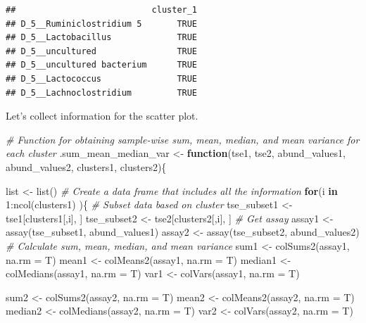 \documentclass[
]{book}
\newenvironment{Shaded}{\begin{snugshade}}{\end{snugshade}}
\newcommand{\AttributeTok}[1]{\textcolor[rgb]{0.77,0.63,0.00}{#1}}
\newcommand{\CommentTok}[1]{\textcolor[rgb]{0.56,0.35,0.01}{\textit{#1}}}
\newcommand{\ControlFlowTok}[1]{\textcolor[rgb]{0.13,0.29,0.53}{\textbf{#1}}}
\newcommand{\DecValTok}[1]{\textcolor[rgb]{0.00,0.00,0.81}{#1}}
\newcommand{\FunctionTok}[1]{\textcolor[rgb]{0.00,0.00,0.00}{#1}}
\newcommand{\NormalTok}[1]{#1}
\newcommand{\OtherTok}[1]{\textcolor[rgb]{0.56,0.35,0.01}{#1}}
\newcommand{\SpecialCharTok}[1]{\textcolor[rgb]{0.00,0.00,0.00}{#1}}
\begin{document}
\begin{verbatim}
##                           cluster_1
## D_5__Ruminiclostridium 5       TRUE
## D_5__Lactobacillus             TRUE
## D_5__uncultured                TRUE
## D_5__uncultured bacterium      TRUE
## D_5__Lactococcus               TRUE
## D_5__Lachnoclostridium         TRUE
\end{verbatim}

Let's collect information for the scatter plot.

\begin{Shaded}
\begin{Highlighting}[]
\CommentTok{\# Function for obtaining sample{-}wise sum, mean, median, and mean variance for each cluster}
\NormalTok{.sum\_mean\_median\_var }\OtherTok{\textless{}{-}} \ControlFlowTok{function}\NormalTok{(tse1, tse2, abund\_values1, abund\_values2, clusters1, clusters2)\{}
  
\NormalTok{  list }\OtherTok{\textless{}{-}} \FunctionTok{list}\NormalTok{()}
  \CommentTok{\# Create a data frame that includes all the information}
  \ControlFlowTok{for}\NormalTok{(i }\ControlFlowTok{in} \DecValTok{1}\SpecialCharTok{:}\FunctionTok{ncol}\NormalTok{(clusters1) )\{}
    \CommentTok{\# Subset data based on cluster}
\NormalTok{    tse\_subset1 }\OtherTok{\textless{}{-}}\NormalTok{ tse1[clusters1[,i], ]}
\NormalTok{    tse\_subset2 }\OtherTok{\textless{}{-}}\NormalTok{ tse2[clusters2[,i], ]}
    \CommentTok{\# Get assay}
\NormalTok{    assay1 }\OtherTok{\textless{}{-}} \FunctionTok{assay}\NormalTok{(tse\_subset1, abund\_values1)}
\NormalTok{    assay2 }\OtherTok{\textless{}{-}} \FunctionTok{assay}\NormalTok{(tse\_subset2, abund\_values2)}
    \CommentTok{\# Calculate sum, mean, median, and mean variance}
\NormalTok{    sum1 }\OtherTok{\textless{}{-}} \FunctionTok{colSums2}\NormalTok{(assay1, }\AttributeTok{na.rm =}\NormalTok{ T)}
\NormalTok{    mean1 }\OtherTok{\textless{}{-}} \FunctionTok{colMeans2}\NormalTok{(assay1, }\AttributeTok{na.rm =}\NormalTok{ T)}
\NormalTok{    median1 }\OtherTok{\textless{}{-}} \FunctionTok{colMedians}\NormalTok{(assay1, }\AttributeTok{na.rm =}\NormalTok{ T)}
\NormalTok{    var1 }\OtherTok{\textless{}{-}} \FunctionTok{colVars}\NormalTok{(assay1, }\AttributeTok{na.rm =}\NormalTok{ T)}
    
\NormalTok{    sum2 }\OtherTok{\textless{}{-}} \FunctionTok{colSums2}\NormalTok{(assay2, }\AttributeTok{na.rm =}\NormalTok{ T)}
\NormalTok{    mean2 }\OtherTok{\textless{}{-}} \FunctionTok{colMeans2}\NormalTok{(assay2, }\AttributeTok{na.rm =}\NormalTok{ T)}
\NormalTok{    median2 }\OtherTok{\textless{}{-}} \FunctionTok{colMedians}\NormalTok{(assay2, }\AttributeTok{na.rm =}\NormalTok{ T)}
\NormalTok{    var2 }\OtherTok{\textless{}{-}} \FunctionTok{colVars}\NormalTok{(assay2, }\AttributeTok{na.rm =}\NormalTok{ T)}
    

\end{Highlighting}
\end{Shaded}
\end{document}
